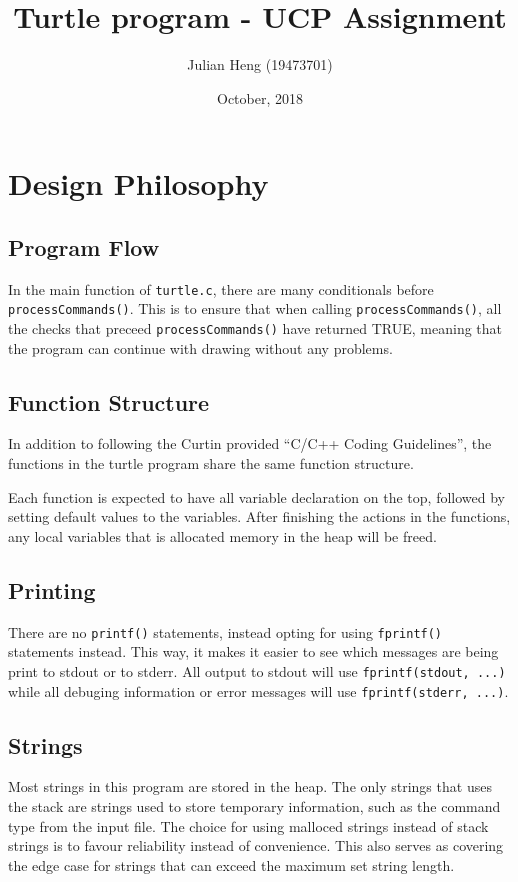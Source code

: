 \documentclass[a4paper, 12pt, titlepage]{article}
\title{\huge Turtle program - UCP Assignment}
\author{Julian Heng (19473701)}
\date{October, 2018}
\newcommand{\code}[1]{\small\texttt{#1}\normalsize}
\begin{document}
\maketitle
\tableofcontents
\newpage

\section{Design Philosophy}

\subsection{Program Flow}

In the main function of \code{turtle.c}, there are many conditionals
before \code{processCommands()}. This is to ensure that when calling
\code{processCommands()}, all the checks that preceed 
\code{processCommands()} have returned TRUE, meaning that the program 
can continue with drawing without any problems.

\subsection{Function Structure}

In addition to following the Curtin provided ``C/C++ Coding Guidelines'', 
the functions in the turtle program share the same function structure.

Each function is expected to have all variable declaration on the top, 
followed by setting default values to the variables. After finishing the 
actions in the functions, any local variables that is allocated memory 
in the heap will be freed.

\subsection{Printing}

There are no \code{printf()} statements, instead opting for using 
\code{fprintf()} statements instead. This way, it makes it easier to 
see which messages are being print to stdout or to stderr. All output 
to stdout will use \code{fprintf(stdout, ...)} while all debuging 
information or error messages will use \code{fprintf(stderr, ...)}.

\subsection{Strings}

Most strings in this program are stored in the heap. The only strings 
that uses the stack are strings used to store temporary information, 
such as the command type from the input file. The choice for using 
malloced strings instead of stack strings is to favour reliability 
instead of convenience. This also serves as covering the edge case 
for strings that can exceed the maximum set string length.
\end{document}
